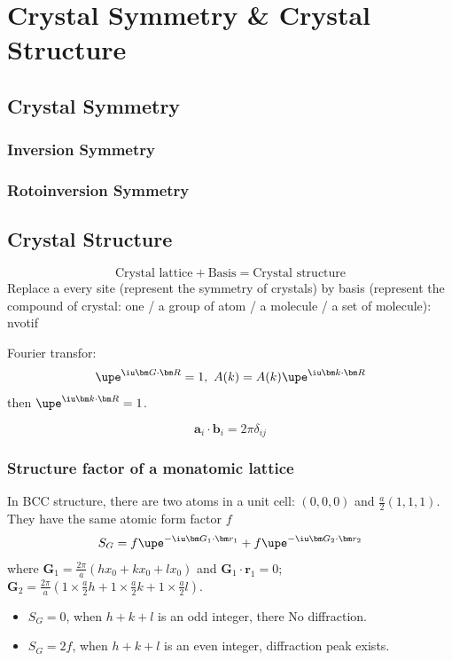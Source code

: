 
\chapter{Crystal Symmetry \& Crystal Structure}

\section{Crystal Symmetry}

\subsection{Inversion Symmetry}

\subsection{Rotoinversion Symmetry}

\section{Crystal Structure}

\begin{equation}
  \text{Crystal lattice} + \text{Basis} = \text{Crystal structure}
\end{equation}
Replace a every site (represent the symmetry of crystals) by basis (represent the compound of crystal: one / a group of atom / a molecule / a set of molecule): nvotif

Fourier transfor:
\begin{equation}
  \upe^{\iu\bm G\cdot\bm R} = 1,~
  A(k) = A(k) \upe^{\iu\bm k\cdot\bm R}
\end{equation}
then $\upe^{\iu\bm k\cdot\bm R} = 1$.

\begin{equation}
  \bm a_i \cdot \bm b_i = 2\pi\delta_{ij}
\end{equation}
\begin{example}
  
\end{example}

\subsection{Structure factor of a monatomic lattice}

In BCC structure, there are two atoms in a unit cell: $(0,0,0)$ and $\frac a2(1,1,1)$.
They have the same atomic form factor $f$
\[
  S_G = f \upe^{-\iu \bm G_1 \cdot \bm r_1} +
        f \upe^{-\iu \bm G_2 \cdot \bm r_2}
\]
where $\bm G_1 = \frac{2\pi}{a} (hx_0 + kx_0 + lx_0)$ and $\bm G_1 \cdot \bm r_1 = 0$;
$\bm G_2 = \frac{2\pi}{a} (1 \times \frac a2h + 1 \times \frac a2k + 1 \times \frac a2l)$.
\begin{itemize}
  \item $S_G = 0$, when $h + k + l$ is an odd integer, there No diffraction.
  \item $S_G = 2f$, when $h + k + l$ is an even integer, diffraction peak exists.
\end{itemize}

